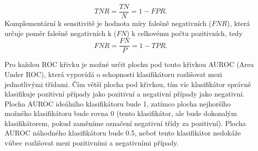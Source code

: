 \begin{equation}
TNR=\frac{TN}{N}=1-FPR.
\end{equation} 
Komplementární k sensitivitě je hodnota míry falešně negativních ($FNR$), která určuje poměr falešně negativních k ($FN$) k celkovému počtu pozitivních, tedy
\begin{equation}
FNR=\frac{FN}{P}=1-TPR.
\end{equation}
\par 
Pro každou ROC křivku je možné určit plochu pod touto křivkou AUROC (Area Under ROC), která vypovídá o schopnosti klasifikátoru rozlišovat mezi jednotlivými třídami. Čím větší plocha pod křivkou, tím víc klasifikátor správně klasifikuje pozitivní případy jako pozitivní a negativní případy jako negativní. Plocha AUROC ideálního klasifikátoru bude 1, zatímco plocha nejhoršího možného klasifikátoru bude rovna 0 (tento klasifikátor, ale bude dokonalým klasifikátorem, pokud zaměníme označení negativní třídy za pozitivní). Plocha AUROC náhodného klasifikátoru bude 0.5, neboť tento klasifikátor nedokáže vůbec rozlišovat mezi pozitivními a negativními případy.
